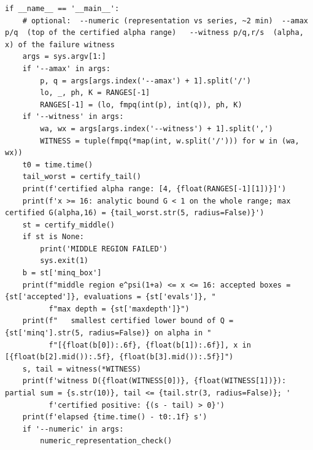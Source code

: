 \documentclass[11pt,a4paper]{article}
\theoremstyle{plain}
\theoremstyle{remark}
\begin{document}
\begin{lstlisting}
if __name__ == '__main__':
    # optional:  --numeric (representation vs series, ~2 min)  --amax p/q  (top of the certified alpha range)   --witness p/q,r/s  (alpha, x) of the failure witness
    args = sys.argv[1:]
    if '--amax' in args:
        p, q = args[args.index('--amax') + 1].split('/')
        lo, _, ph, K = RANGES[-1]
        RANGES[-1] = (lo, fmpq(int(p), int(q)), ph, K)
    if '--witness' in args:
        wa, wx = args[args.index('--witness') + 1].split(',')
        WITNESS = tuple(fmpq(*map(int, w.split('/'))) for w in (wa, wx))
    t0 = time.time()
    tail_worst = certify_tail()
    print(f'certified alpha range: [4, {float(RANGES[-1][1])}]')
    print(f'x >= 16: analytic bound G < 1 on the whole range; max certified G(alpha,16) = {tail_worst.str(5, radius=False)}')
    st = certify_middle()
    if st is None:
        print('MIDDLE REGION FAILED')
        sys.exit(1)
    b = st['minq_box']
    print(f"middle region e^psi(1+a) <= x <= 16: accepted boxes = {st['accepted']}, evaluations = {st['evals']}, "
          f"max depth = {st['maxdepth']}")
    print(f"   smallest certified lower bound of Q = {st['minq'].str(5, radius=False)} on alpha in "
          f"[{float(b[0]):.6f}, {float(b[1]):.6f}], x in [{float(b[2].mid()):.5f}, {float(b[3].mid()):.5f}]")
    s, tail = witness(*WITNESS)
    print(f'witness D({float(WITNESS[0])}, {float(WITNESS[1])}): partial sum = {s.str(10)}, tail <= {tail.str(3, radius=False)}; '
          f'certified positive: {(s - tail) > 0}')
    print(f'elapsed {time.time() - t0:.1f} s')
    if '--numeric' in args:
        numeric_representation_check()
\end{lstlisting}
\end{document}
